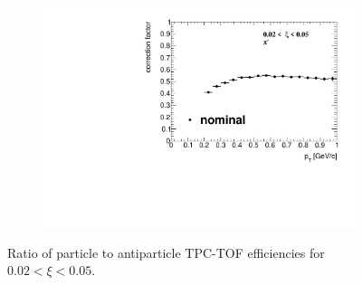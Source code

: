 \begin{itemize}
\end{itemize}

\begin{figure}[h!]
	\centering
	\begin{subfigure}{.49\textwidth}
		\includegraphics[width=\textwidth,page=7]{chapters/chrgSTAR/img/ratiosEffi/correction.pdf}
	\end{subfigure}
	\begin{minipage}{.49\textwidth}
		\caption{Ratio of particle to antiparticle TPC-TOF efficiencies for $0.02<\xi<0.05$.}
		\label{fig:ratios_efficiency}
	\end{minipage}
	
\end{figure}